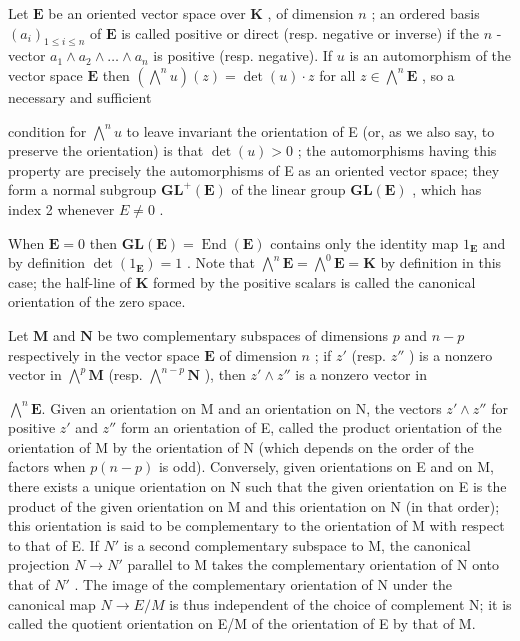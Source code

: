 Let \(\mathbf{E}\) be an oriented vector space over \(\mathbf{K}\) , of dimension \(n\) ; an ordered basis \((a_i)_{1 \leqslant i \leqslant n}\) of \(\mathbf{E}\) is called positive or direct (resp. negative or inverse) if the \(n\) -vector \(a_1 \wedge a_2 \wedge \ldots \wedge a_n\) is positive (resp. negative). If \(u\) is an automorphism of the vector space \(\mathbf{E}\) then \((\bigwedge^{n} u)(z) = \det(u) \cdot z\) for all \(z \in \bigwedge^{n} \mathbf{E}\) , so a necessary and sufficient

condition for \(\bigwedge^{n} u\) to leave invariant the orientation of E (or, as we also say, to preserve the orientation) is that \(\det(u) > 0\) ; the automorphisms having this property are precisely the automorphisms of E as an oriented vector space; they form a normal subgroup \(\mathbf{GL}^{+}(\mathbf{E})\) of the linear group \(\mathbf{GL}(\mathbf{E})\) , which has index 2 whenever \(E \neq 0\) .

When \(\mathbf{E} = 0\) then \(\mathbf{GL}(\mathbf{E}) = \operatorname{End}(\mathbf{E})\) contains only the identity map \(1_{\mathbf{E}}\) and by definition \(\det(1_{\mathbf{E}}) = 1\) . Note that \(\bigwedge^{n}\mathbf{E} = \bigwedge^{0}\mathbf{E} = \mathbf{K}\) by definition in this case; the half-line of \(\mathbf{K}\) formed by the positive scalars is called the canonical orientation of the zero space.

Let \(\mathbf{M}\) and \(\mathbf{N}\) be two complementary subspaces of dimensions \(p\) and \(n - p\) respectively in the vector space \(\mathbf{E}\) of dimension \(n\) ; if \(z'\) (resp. \(z''\) ) is a nonzero vector in \(\bigwedge^{p} \mathbf{M}\) (resp. \(\bigwedge^{n - p} \mathbf{N}\) ), then \(z' \wedge z''\) is a nonzero vector in

\(\bigwedge^{n} \mathbf{E}\). Given an orientation on M and an orientation on N, the vectors \(z' \wedge z''\) for positive \(z'\) and \(z''\) form an orientation of E, called the product orientation of the orientation of M by the orientation of N (which depends on the order of the factors when \(p(n - p)\) is odd). Conversely, given orientations on E and on M, there exists a unique orientation on N such that the given orientation on E is the product of the given orientation on M and this orientation on N (in that order); this orientation is said to be complementary to the orientation of M with respect to that of E. If \(N'\) is a second complementary subspace to M, the canonical projection \(N \to N'\) parallel to M takes the complementary orientation of N onto that of \(N'\) . The image of the complementary orientation of N under the canonical map \(N \to E/M\) is thus independent of the choice of complement N; it is called the quotient orientation on E/M of the orientation of E by that of M.

